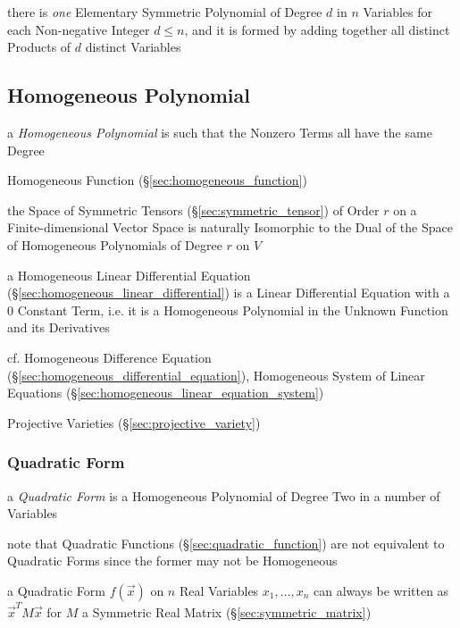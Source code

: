 there is \emph{one} Elementary Symmetric Polynomial of Degree $d$ in $n$
Variables for each Non-negative Integer $d \leq n$, and it is formed by adding
together all distinct Products of $d$ distinct Variables



\subsection{Homogeneous Polynomial}\label{sec:homogeneous_polynomial}

a \emph{Homogeneous Polynomial} is such that the Nonzero Terms all have the same
Degree

Homogeneous Function (\S\ref{sec:homogeneous_function})

the Space of Symmetric Tensors (\S\ref{sec:symmetric_tensor}) of Order $r$ on a
Finite-dimensional Vector Space is naturally Isomorphic to the Dual of the
Space of Homogeneous Polynomials of Degree $r$ on $V$

a Homogeneous Linear Differential Equation
(\S\ref{sec:homogeneous_linear_differential}) is a Linear Differential
Equation with a $0$ Constant Term, i.e. it is a Homogeneous Polynomial in the
Unknown Function and its Derivatives

cf. Homogeneous Difference Equation
(\S\ref{sec:homogeneous_differential_equation}),
Homogeneous System of Linear Equations
(\S\ref{sec:homogeneous_linear_equation_system})

Projective Varieties (\S\ref{sec:projective_variety})



\subsubsection{Quadratic Form}\label{sec:quadratic_form}

a \emph{Quadratic Form} is a Homogeneous Polynomial of Degree Two in a number of
Variables

note that Quadratic Functions (\S\ref{sec:quadratic_function}) are not
equivalent to Quadratic Forms since the former may not be Homogeneous

a Quadratic Form $f(\vec{x})$ on $n$ Real Variables $x_1,\ldots,x_n$ can always
be written as $\vec{x}^T M \vec{x}$ for $M$ a Symmetric Real Matrix
(\S\ref{sec:symmetric_matrix})

